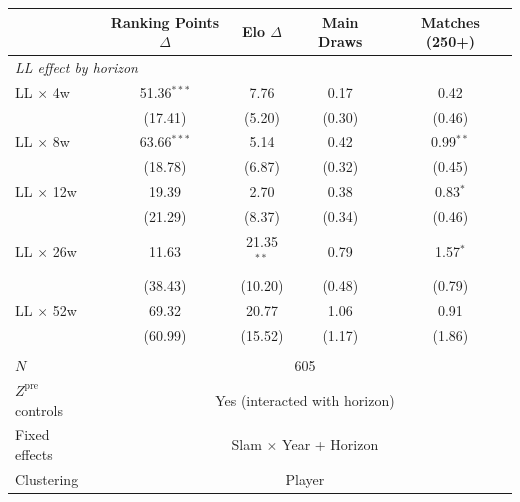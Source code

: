 \begin{tabular}{lcccc}
\toprule
 & Ranking Points $\Delta$ & Elo $\Delta$ & Main Draws & Matches (250+) \\
\midrule
\multicolumn{5}{l}{\textit{LL effect by horizon}} \\
\quad LL $\times$ 4w & 51.36$^{***}$ & 7.76 & 0.17 & 0.42 \\
 & (17.41) & (5.20) & (0.30) & (0.46) \\
\quad LL $\times$ 8w & 63.66$^{***}$ & 5.14 & 0.42 & 0.99$^{**}$ \\
 & (18.78) & (6.87) & (0.32) & (0.45) \\
\quad LL $\times$ 12w & 19.39 & 2.70 & 0.38 & 0.83$^{*}$ \\
 & (21.29) & (8.37) & (0.34) & (0.46) \\
\quad LL $\times$ 26w & 11.63 & 21.35$^{**}$ & 0.79 & 1.57$^{*}$ \\
 & (38.43) & (10.20) & (0.48) & (0.79) \\
\quad LL $\times$ 52w & 69.32 & 20.77 & 1.06 & 0.91 \\
 & (60.99) & (15.52) & (1.17) & (1.86) \\
\\[0.3em]
\midrule
$N$ & \multicolumn{4}{c}{605} \\
$Z^{\text{pre}}$ controls & \multicolumn{4}{c}{Yes (interacted with horizon)} \\
Fixed effects & \multicolumn{4}{c}{Slam $\times$ Year + Horizon} \\
Clustering & \multicolumn{4}{c}{Player} \\
\bottomrule
\end{tabular}
